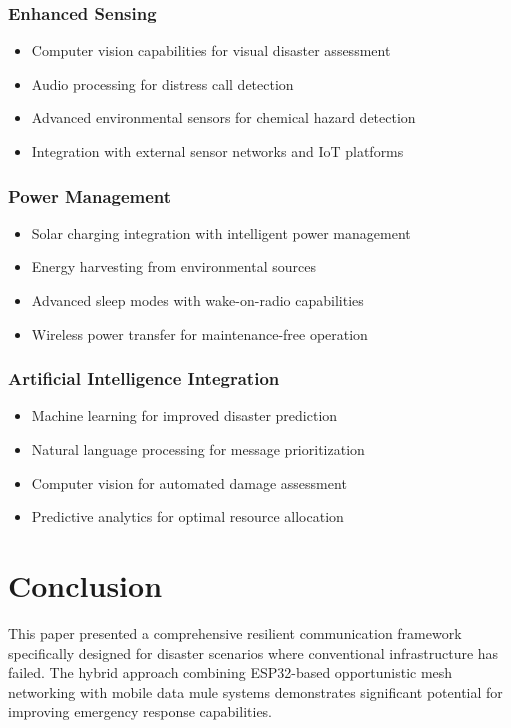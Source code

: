 \documentclass[conference]{IEEEtran}
\begin{document}
\subsubsection{Enhanced Sensing}
\begin{itemize}
\item Computer vision capabilities for visual disaster assessment
\item Audio processing for distress call detection
\item Advanced environmental sensors for chemical hazard detection
\item Integration with external sensor networks and IoT platforms
\end{itemize}

\subsubsection{Power Management}
\begin{itemize}
\item Solar charging integration with intelligent power management
\item Energy harvesting from environmental sources
\item Advanced sleep modes with wake-on-radio capabilities
\item Wireless power transfer for maintenance-free operation
\end{itemize}

\subsubsection{Artificial Intelligence Integration}
\begin{itemize}
\item Machine learning for improved disaster prediction
\item Natural language processing for message prioritization
\item Computer vision for automated damage assessment
\item Predictive analytics for optimal resource allocation
\end{itemize}

\section{Conclusion}

This paper presented a comprehensive resilient communication framework specifically designed for disaster scenarios where conventional infrastructure has failed. The hybrid approach combining ESP32-based opportunistic mesh networking with mobile data mule systems demonstrates significant potential for improving emergency response capabilities.
\end{document}
